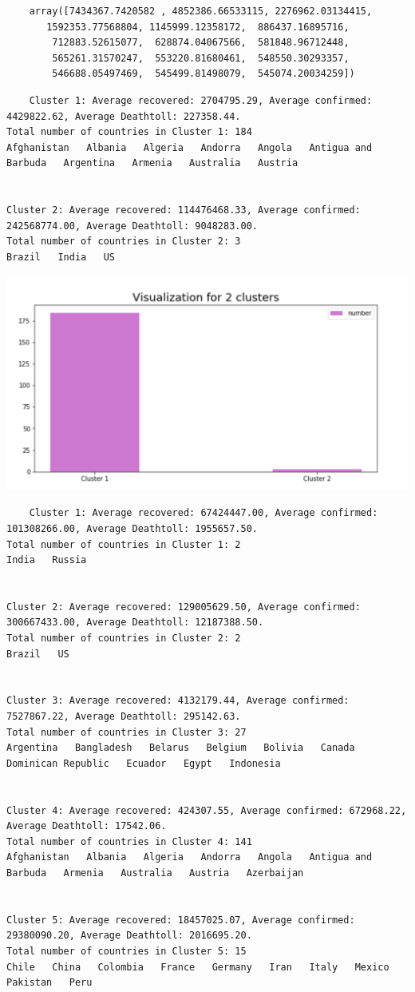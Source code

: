 \documentclass{article}
\begin{document}
\begin{verbatim}
    array([7434367.7420582 , 4852386.66533115, 2276962.03134415,
       1592353.77568804, 1145999.12358172,  886437.16895716,
        712883.52615077,  628874.04067566,  581848.96712448,
        565261.31570247,  553220.81680461,  548550.30293357,
        546688.05497469,  545499.81498079,  545074.20034259])
\end{verbatim}
\begin{verbatim}
    Cluster 1: Average recovered: 2704795.29, Average confirmed: 4429822.62, Average Deathtoll: 227358.44.
Total number of countries in Cluster 1: 184
Afghanistan   Albania   Algeria   Andorra   Angola   Antigua and Barbuda   Argentina   Armenia   Australia   Austria   


Cluster 2: Average recovered: 114476468.33, Average confirmed: 242568774.00, Average Deathtoll: 9048283.00.
Total number of countries in Cluster 2: 3
Brazil   India   US   
\end{verbatim}
\includegraphics[scale=0.75]{cluster_graph3.png}
\begin{verbatim}
    Cluster 1: Average recovered: 67424447.00, Average confirmed: 101308266.00, Average Deathtoll: 1955657.50.
Total number of countries in Cluster 1: 2
India   Russia   


Cluster 2: Average recovered: 129005629.50, Average confirmed: 300667433.00, Average Deathtoll: 12187388.50.
Total number of countries in Cluster 2: 2
Brazil   US   


Cluster 3: Average recovered: 4132179.44, Average confirmed: 7527867.22, Average Deathtoll: 295142.63.
Total number of countries in Cluster 3: 27
Argentina   Bangladesh   Belarus   Belgium   Bolivia   Canada   Dominican Republic   Ecuador   Egypt   Indonesia   


Cluster 4: Average recovered: 424307.55, Average confirmed: 672968.22, Average Deathtoll: 17542.06.
Total number of countries in Cluster 4: 141
Afghanistan   Albania   Algeria   Andorra   Angola   Antigua and Barbuda   Armenia   Australia   Austria   Azerbaijan   


Cluster 5: Average recovered: 18457025.07, Average confirmed: 29380090.20, Average Deathtoll: 2016695.20.
Total number of countries in Cluster 5: 15
Chile   China   Colombia   France   Germany   Iran   Italy   Mexico   Pakistan   Peru   
\end{verbatim}
\end{document}
